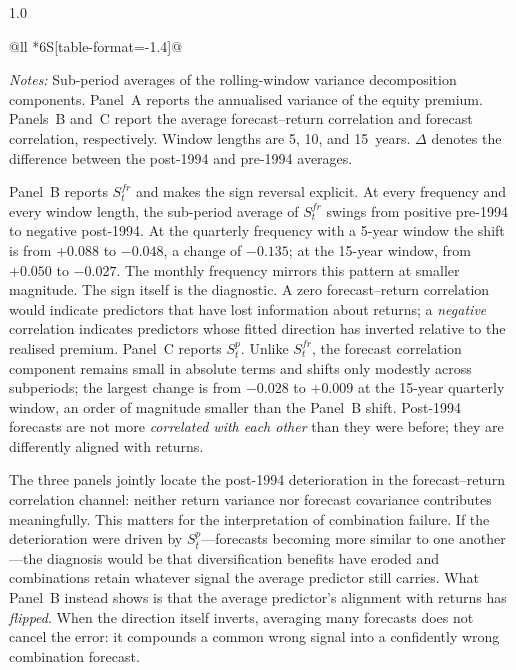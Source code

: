 \documentclass[a4paper,11pt]{article}
\begin{document}
\begin{spacing}{1.0}
\begin{table}[H]
\begin{tabular}{@{}ll
                *{6}{S[table-format=-1.4]}@{}}
\bottomrule
\end{tabular}
\vspace{0.4em}
\begin{minipage}{0.85\textwidth}
\footnotesize
\textit{Notes:} Sub-period averages of the rolling-window variance
decomposition components. Panel~A reports the annualised variance of the
equity premium. Panels~B and~C report the average forecast--return
correlation and forecast correlation, respectively. Window lengths are 5,
10, and 15~years. $\Delta$ denotes the difference between the post-1994
and pre-1994 averages.
\end{minipage}
\end{table}
\end{spacing}

Panel~B reports $S^{fr}_t$ and makes the sign reversal explicit.
At every frequency and every window length, the sub-period average of
$S^{fr}_t$ swings from positive pre-1994 to negative post-1994. At the
quarterly frequency with a 5-year window the shift is from $+0.088$ to
$-0.048$, a change of $-0.135$; at the 15-year window, from $+0.050$ to
$-0.027$. The monthly frequency mirrors this pattern at smaller magnitude.
The sign itself is the diagnostic. A zero forecast--return correlation
would indicate predictors that have lost information about returns; a
\emph{negative} correlation indicates predictors whose fitted direction
has inverted relative to the realised premium. Panel~C reports $S^{p}_t$.
Unlike $S^{fr}_t$, the forecast correlation component remains small in
absolute terms and shifts only modestly across subperiods; the largest
change is from $-0.028$ to $+0.009$ at the 15-year quarterly window, an
order of magnitude smaller than the Panel~B shift. Post-1994 forecasts
are not more \emph{correlated with each other} than they were before;
they are differently aligned with returns.

The three panels jointly locate the post-1994 deterioration in the
forecast--return correlation channel: neither return variance nor
forecast covariance contributes meaningfully. This matters for the
interpretation of combination failure. If the deterioration were driven
by $S^{p}_t$---forecasts becoming more similar to one another---the
diagnosis would be that diversification benefits have eroded and
combinations retain whatever signal the average predictor still carries.
What Panel~B instead shows is that the average predictor's alignment
with returns has \emph{flipped}. When the direction itself inverts,
averaging many forecasts does not cancel the error: it compounds a
common wrong signal into a confidently wrong combination forecast.
\end{document}

